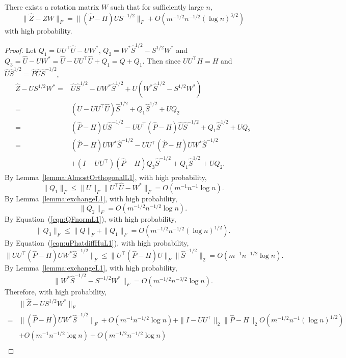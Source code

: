 \begin{lemma}
\label{lemma:XhatDiffXWexpressionL1}
There exists a rotation matrix $W$ such that for sufficiently large $n$,
\[
	\|\hat{Z} - Z W\|_F = \| (\hat{P} - H) U S^{-1/2} \|_F + O(m^{-1/2} n^{-1/2} (\log n)^{3/2})
\]
with high probability.
\end{lemma}
\begin{proof}
Let $Q_1 = U U^{\top} \hat{U} - U W^*$, $Q_2 = W^* \hat{S}^{1/2} - S^{1/2} W^*$ and $Q_3 = \hat{U} - U W^* = \hat{U} - U U^{\top} \hat{U} + Q_1 = Q + Q_1$. Then since $U U^{\top} H = H$ and $\hat{U} \hat{S}^{1/2} = \hat{P} \hat{U} \hat{S}^{-1/2}$,
\begin{align*}
	\hat{Z} - U S^{1/2} W^*
    = & \hat{U} \hat{S}^{1/2} - U W^* \hat{S}^{1/2} + U(W^* \hat{S}^{1/2} - S^{1/2} W^*) \\
    = & (\hat{U} - U U^{\top} \hat{U}) \hat{S}^{1/2} + Q_1 \hat{S}^{1/2} + U Q_2 \\
    = & (\hat{P} - H) \hat{U} \hat{S}^{-1/2} - U U^{\top}(\hat{P} - H)\hat{U}\hat{S}^{-1/2} + Q_1 \hat{S}^{1/2} + U Q_2 \\
    = & (\hat{P} - H) U W^* \hat{S}^{-1/2} - U U^{\top}(\hat{P} - H)U W^*\hat{S}^{-1/2} \\
    & + (I - U U^{\top})(\hat{P} - H) Q_3 \hat{S}^{-1/2} + Q_1 \hat{S}^{1/2} + U Q_2.
\end{align*}
By Lemma~\ref{lemma:AlmostOrthogonalL1}, with high probability, 
\[
	\|Q_1\|_F \le \| U\|_F \| U^{\top} \hat{U} - W^* \|_F = O(m^{-1} n^{-1} \log n).
\]
By Lemma~\ref{lemma:exchangeL1}, with high probability, 
\[
	\|Q_2\|_F = O(m^{-1/2} n^{-1/2} \log n).
\]
By Equation~(\ref{eqn:QFnormL1}), with high probability, 
\[
	\|Q_3\|_F \le \|Q\|_F + \|Q_1\|_F = O(m^{-1/2} n^{-1/2} (\log n)^{1/2}).
\]
By Equation~(\ref{eqn:uPhatdiffHuL1}), with high probability, 
\[
	\| U U^{\top}(\hat{P} - H)U W^*\hat{S}^{-1/2} \|_F
    \le \| U^{\top}(\hat{P} - H)U \|_F \| \hat{S}^{-1/2} \|_2
    = O(m^{-1} n^{-1/2} \log n).
\]
By Lemma~\ref{lemma:exchangeL1}, with high probability, 
\[
	\| W^* \hat{S}^{-1/2} - S^{-1/2} W^* \|_F = O(m^{-1/2} n^{-3/2} \log n).
\]
Therefore, with high probability, 
\begin{align*}
	& \| \hat{Z} - U S^{1/2} W^* \|_F \\
    = & \| (\hat{P} - H) U W^* \hat{S}^{-1/2} \|_F + O(m^{-1} n^{-1/2} \log n)
    + \|I - U U^{\top} \|_2 \| \hat{P} - H \|_2 O(m^{-1/2} n^{-1} (\log n)^{1/2}) \\
    & + O(m^{-1} n^{-1/2} \log n) + O(m^{-1/2} n^{-1/2} \log n)\\

\end{align*}
\end{proof}
